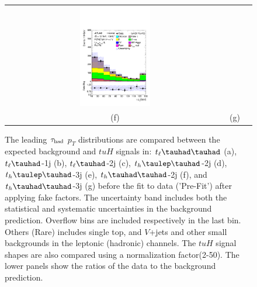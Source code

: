 \begin{figure}[H]
\begin{tabular}{@{}ccc@{}}
\includegraphics[page=1,width=0.33\textwidth]{figures/new_pt/reg2mtau1b3jos_vetobtagwp70_highmet.pdf}\\
(f) & (g) \\
\end{tabular}
\caption{The leading $\tau_\text{had}$ $p_T$  distributions are compared between the expected background and $tuH$ signals in: $t_{\ell}\thadhad$ (a),  $t_{\ell}\tauhad$-1j (b),  $t_{\ell}\tauhad$-2j (c), $t_h\tlhad$-2j (d), $t_h\tlhad$-3j (e), $t_h\thadhad$-2j (f), and $t_h\thadhad$-3j (g) before the fit to data ('Pre-Fit') after applying fake factors. The uncertainty band includes both the statistical and systematic uncertainties in the background prediction. Overflow bins are included respectively in the last bin. Others (Rare) includes single top, and $V$+jets and other small backgrounds in the leptonic (hadronic) channels. The $tuH$ signal shapes are also compared using a normalization factor(2-50).   
The lower panels show the ratios of the data to the background prediction.}
\label{fig:taupt_prefit}
\end{figure}




